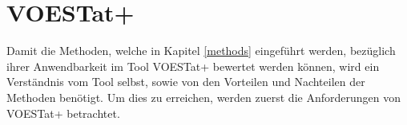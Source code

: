 \documentclass[12pt,titlepage,oneside]{book}
\begin{document}















\chapter{VOESTat+} \label{voestat}
Damit die Methoden, welche in Kapitel \ref{methods} eingeführt werden, bezüglich ihrer Anwendbarkeit im Tool VOESTat+ bewertet werden können, wird ein Verständnis vom Tool selbst, sowie von den Vorteilen und Nachteilen der Methoden benötigt. Um dies zu erreichen, werden zuerst die Anforderungen von VOESTat+ betrachtet.
\end{document}
